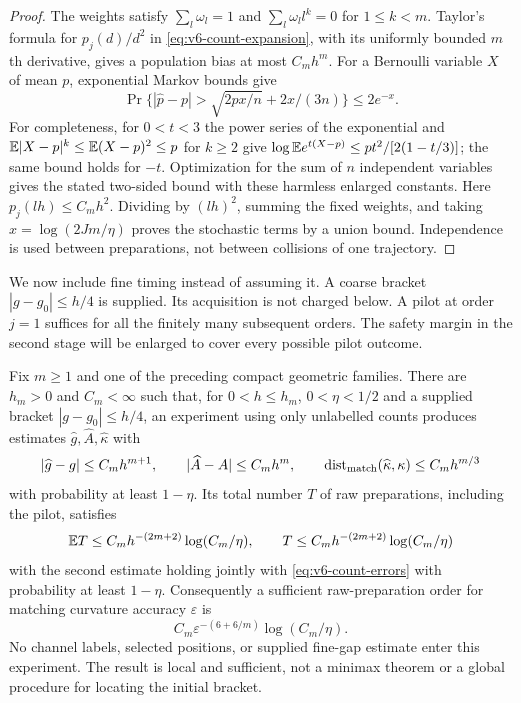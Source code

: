 \begin{proof}
The weights satisfy $\sum_l\omega_l=1$ and
$\sum_l\omega_l l^k=0$ for $1\le k<m$. Taylor's formula for
$p_j(d)/d^2$ in \eqref{eq:v6-count-expansion}, with its uniformly
bounded $m$th derivative, gives a population bias at most $C_mh^m$.
For a Bernoulli variable $X$ of mean $p$, exponential Markov bounds give
\[
 \Pr\{|\widehat p-p|>\sqrt{2px/n}+2x/(3n)\}\le2e^{-x}.
\]
For completeness, for $0<t<3$ the power series of the exponential and
$\mathbb E|X-p|^k\le\mathbb E(X-p)^2\le p$ for $k\ge2$ give
$\log\mathbb E e^{t(X-p)}\le pt^2/[2(1-t/3)]$; the same bound holds for
$-t$. Optimization for the sum of $n$ independent variables gives the
stated two-sided bound with these harmless enlarged constants.
Here $p_j(lh)\le C_m h^2$. Dividing by $(lh)^2$, summing the fixed
weights, and taking $x=\log(2Jm/\eta)$ proves the stochastic terms by
a union bound. Independence is used between preparations, not between
collisions of one trajectory.
\end{proof}

We now include fine timing instead of assuming it. A coarse bracket
$|g-g_0|\le h/4$ is supplied. Its acquisition is not charged below.
A pilot at order $j=1$ suffices for all the finitely many subsequent
orders. The safety margin in the second stage will be enlarged to
cover every possible pilot outcome.

\begin{theorem}
\label{thm:v6-count-only}
Fix $m\ge1$ and one of the preceding compact geometric families.
There are $h_m>0$ and $C_m<\infty$ such that, for
$0<h\le h_m$, $0<\eta<1/2$ and a supplied bracket
$|g-g_0|\le h/4$, an experiment using only unlabelled counts produces
estimates $\widehat g,\widehat A,\widehat\kappa$ with
\begin{equation}\label{eq:v6-count-errors}
 |\widehat g-g|\le C_mh^{m+1},\qquad
 |\widehat A-A|\le C_mh^m,\qquad
 \operatorname{dist}_{\rm match}(\widehat\kappa,\kappa)
                                         \le C_mh^{m/3}
\end{equation}
with probability at least $1-\eta$. Its total number $T$ of raw
preparations, including the pilot, satisfies
\begin{equation}\label{eq:v6-count-cost}
 \mathbb E T\le C_mh^{-(2m+2)}\log(C_m/\eta),\qquad
 T\le C_mh^{-(2m+2)}\log(C_m/\eta)
\end{equation}
with the second estimate holding jointly with
\eqref{eq:v6-count-errors} with probability at least $1-\eta$.
Consequently a sufficient raw-preparation order for matching curvature
accuracy $\varepsilon$ is
\begin{equation}\label{eq:v6-count-rate}
 C_m\varepsilon^{-(6+6/m)}\log(C_m/\eta).
\end{equation}
No channel labels, selected positions, or supplied fine-gap estimate
enter this experiment. The result is local and sufficient, not a
minimax theorem or a global procedure for locating the initial bracket.
\end{theorem}

